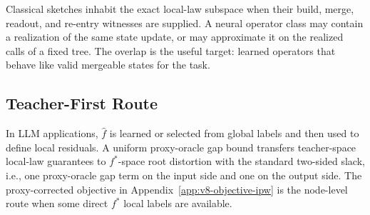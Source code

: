 Classical sketches inhabit the exact local-law subspace when their build,
merge, readout, and re-entry witnesses are supplied. A neural operator class
may contain a realization of the same state update, or may approximate it on
the realized calls of a fixed tree. The overlap is the useful target: learned
operators that behave like valid mergeable states for the task.

\subsection{Teacher-First Route}

In LLM applications, \(\widehat f\) is learned or selected from global labels
and then used to define local residuals. A uniform proxy-oracle gap bound
transfers teacher-space local-law guarantees to \(f^\ast\)-space root
distortion with the standard two-sided slack, i.e., one proxy-oracle gap term
on the input side and one on the output side. The proxy-corrected objective in
Appendix~\ref{app:v8-objective-ipw} is the node-level route when some direct
\(f^\ast\) local labels are available.
